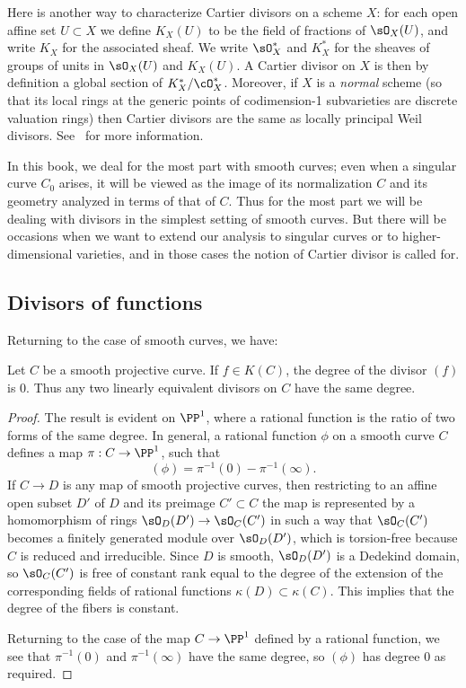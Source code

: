 Here is another way to characterize Cartier divisors on a scheme $X$: for each open affine set $U\subset X$ we define $K_X(U)$ to be the field of fractions of $\sO_X(U)$, and write $K_X$ for the
%
%
associated sheaf. We write $\sO_X^*$ and $K_X^*$ for the sheaves of groups of units in $\sO_X(U)$ and $K_X(U)$.
A Cartier divisor on $X$ is then by definition a global section of $K_X^*/\cO_X^*$.
Moreover, if $X$ is a
\emph{normal} scheme
(so that its local rings at
%
the generic points of codimension-1 subvarieties are discrete
valuation rings) then Cartier divisors are the same as locally
principal Weil divisors. See~\cite[Section II.6]{Hartshorne1977} for
more information.

In this book, we
deal
for the most part with smooth curves;
even when a singular curve $C_{0}$ arises, it will be viewed as the image of its normalization
$C$
and its geometry
analyzed in terms of that of $C$. Thus for the most part we will
be dealing with divisors in the simplest setting of smooth curves. But
there will be occasions when we want to extend our analysis to
singular curves
or to
higher-dimensional varieties, and in those
cases the notion of Cartier divisor is called for.

\subsection*{Divisors of functions}

Returning to the case of smooth curves, we have:

\begin{theorem}\label{degree defn}
Let $C$ be a smooth projective curve. If $f\in K(C)$,
the degree of the divisor $(f)$ is $0$.
Thus any two linearly equivalent divisors on $C$ have the
same degree.
\end{theorem}

\begin{proof}
 The result is evident on $\PP^1$, where a rational
function is the ratio of two forms of the same degree. In general, a rational function $\phi$ on a smooth curve $C$ defines a map $\pi : C \to \PP^1$, such that
$$
(\phi) = \pi^{-1}(0) - \pi^{-1}(\infty).
$$
If $C\to D$ is any map of smooth projective curves, then restricting
to an affine open subset $D'$ of $D$ and its preimage
$C'\subset C$
the map is represented by a homomorphism of rings $\sO_D(D') \to \sO_C(C')$ in such a way that $\sO_C(C')$ becomes a finitely generated
module over $\sO_D(D')$, which is torsion-free because $C$ is reduced and irreducible. Since $D$ is smooth,
$\sO_D(D')$ is a Dedekind domain, so $\sO_C(C')$ is free of constant rank equal to the degree of the extension of the corresponding
 fields of rational functions $\kappa(D)\subset \kappa(C)$. This implies that the degree of the fibers is constant.

 Returning to the case of the map $C\to \PP^1$ defined by a rational function, we see that $\pi^{-1}(0)$ and $ \pi^{-1}(\infty)$
 have the same degree, so $(\phi)$ has degree 0 as required.
\end{proof}

